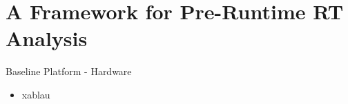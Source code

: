 \section{A Framework for Pre-Runtime RT Analysis}

\begin{frame}{Baseline Platform - Hardware}
	\begin{itemize}
		\item xablau
	\end{itemize}
\end{frame}